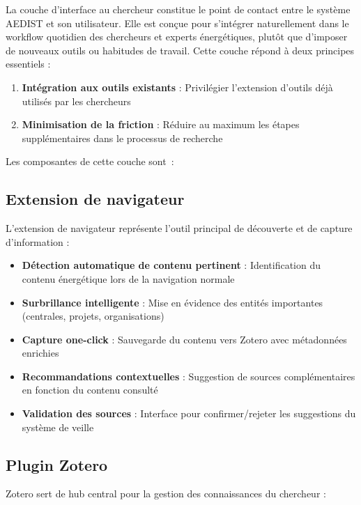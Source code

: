 \documentclass[a4paper,11pt]{report}
\providecommand{\tightlist}{\setlength{\itemsep}{0pt}\setlength{\parskip}{0pt}}
\begin{document}
La couche d'interface au chercheur constitue le point de contact entre le système AEDIST et son utilisateur. Elle est conçue pour s'intégrer naturellement dans le workflow quotidien des chercheurs et experts énergétiques, plutôt que d'imposer de nouveaux outils ou habitudes de travail. Cette couche répond à deux principes essentiels :

\begin{enumerate}
\def\labelenumi{\arabic{enumi}.}
\tightlist
\item
  \textbf{Intégration aux outils existants} : Privilégier l'extension d'outils déjà utilisés par les chercheurs
\item
  \textbf{Minimisation de la friction} : Réduire au maximum les étapes supplémentaires dans le processus de recherche
\end{enumerate}

Les composantes de cette couche sont~:

\subsection{Extension de navigateur}\label{extension-de-navigateur}

L'extension de navigateur représente l'outil principal de découverte et de capture d'information :

\begin{itemize}
\tightlist
\item
  \textbf{Détection automatique de contenu pertinent} : Identification du contenu énergétique lors de la navigation normale
\item
  \textbf{Surbrillance intelligente} : Mise en évidence des entités importantes (centrales, projets, organisations)
\item
  \textbf{Capture one-click} : Sauvegarde du contenu vers Zotero avec métadonnées enrichies
\item
  \textbf{Recommandations contextuelles} : Suggestion de sources complémentaires en fonction du contenu consulté
\item
  \textbf{Validation des sources} : Interface pour confirmer/rejeter les suggestions du système de veille
\end{itemize}

\subsection{Plugin Zotero}\label{plugin-zotero}

Zotero sert de hub central pour la gestion des connaissances du chercheur :
\end{document}
